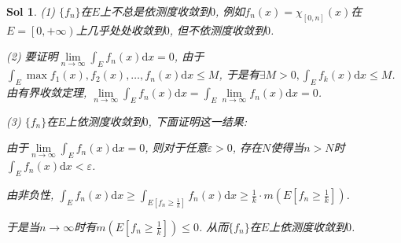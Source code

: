 \documentclass[UTF8]{article}
\newtheorem{solution}{Sol}
\begin{document}
  \begin{solution}
    (1) $\{f_n\}$在$E$上不总是依测度收敛到$0$, 例如$f_n(x)=\chi_{[0,n]}(x)$在$E=\left[0,\right.\left.+\infty\right)$上几乎处处收敛到$0$, 但不依测度收敛到$0$.\par
    (2) 要证明$\lim \limits_{n \to \infty}\int_{E}f_n(x)\mathrm{d}x=0$, 由于$\int_{E} \max{f_1(x),f_2(x),\ldots,f_n(x)}\mathrm{d}x\leqslant M$, 
    于是有$\exists M>0, \int_{E}f_k(x)\mathrm{d}x\leqslant M$. 由有界收敛定理, $\lim \limits_{n \to \infty}\int_{E}f_n(x)\mathrm{d}x=\int_{E}\lim \limits_{n \to \infty}f_n(x)\mathrm{d}x=0$.\par
    (3) $\{f_n\}$在$E$上依测度收敛到$0$, 下面证明这一结果:\par
    由于$\lim \limits_{n \to \infty}\int_{E}f_n(x)\mathrm{d}x=0$, 则对于任意$\varepsilon >0$, 存在$N$使得当$n>N$时$\int_{E}f_n(x)\mathrm{d}x<\varepsilon$.\par
    由非负性, $\int_{E}f_n(x)\mathrm{d}x\geqslant \int_{E\left[f_n\geqslant \frac{1}{k}\right]}f_n(x)\mathrm{d}x\geqslant \frac{1}{k}\cdot m\left(E\left[f_n\geqslant \frac{1}{k}\right]\right)$.\par
    于是当$n \to \infty$时有$m\left(E\left[f_n\geqslant \frac{1}{k}\right]\right)\leqslant 0$. 从而$\{f_n\}$在$E$上依测度收敛到$0$.\par
  \end{solution}
\end{document}
